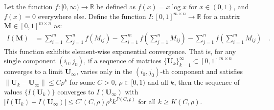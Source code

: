 \documentclass[../../main.tex]{subfiles}
\begin{document}
\begin{theorem}
Let the function $f: [0, \infty) \to \mathbb{R}$ be defined as $f(x) = x \log x$ for $x \in (0, 1)$, and $f(x) = 0$ everywhere else. Define the function $I: [0, 1]^{m \times n} \to \mathbb{R}$ for a matrix $\bm{M} \in [0, 1]^{m \times n}$ as:
\begin{align*}
    I(\bm{M}) &= \sum_{i=1}^m \sum_{j=1}^n f(M_{ij}) - \sum_{i=1}^m f\left(\sum_{j=1}^n M_{ij}\right) - \sum_{j=1}^n f\left(\sum_{i=1}^m M_{ij}\right) \quad .
\end{align*}
This function exhibits element-wise exponential convergence. That is, for any single component $(i_0, j_0)$, if a sequence of matrices $\{\bm{U}_k\}_{k=1}^\infty \subset [0, 1]^{m \times n}$ converges to a limit $\bm{U}_\infty$, varies only in the $(i_0, j_0)$-th component and satisfies $\|\bm{U}_k - \bm{U}_\infty\| \leq C \rho^k$ for some $C > 0$, $\rho \in [0, 1)$ and all $k$, then the sequence of values $\{I(\bm{U}_k)\}$ converges to $I(\bm{U}_\infty)$ with $|I(\bm{U}_k) - I(\bm{U}_\infty)| \leq C'(C, \rho) \rho^k k^{P(C, \rho)}$ for all $k \geq K(C, \rho)$.
\end{theorem}
\pagebreak
\end{document}
